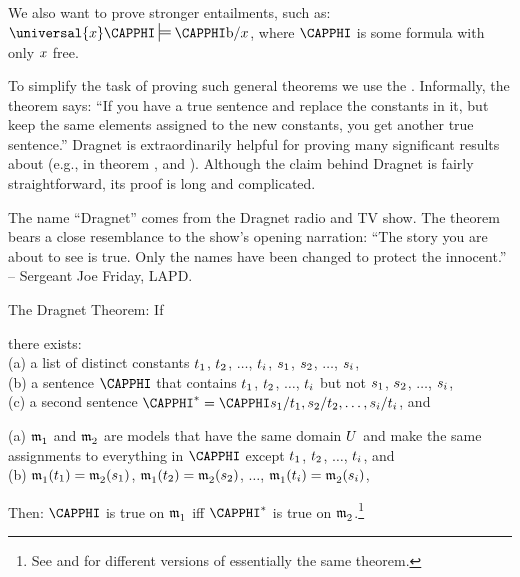 We also want to prove stronger entailments, such as: $\universal{\variable{x}}\CAPPHI\sdtstile{}{}\CAPPHI\constant{b}/\variable{x}$, where $\CAPPHI$ is some \GQL{} formula with only $x$ free.

To simplify the task of proving such general theorems we use the .
Informally, the theorem says: ``If you have a true sentence and replace the constants in it, but keep the same elements assigned to the new constants, you get another true sentence.''
Dragnet is extraordinarily helpful for proving many significant results about \GQL{} (e.g., in theorem , and ).
Although the claim behind Dragnet is fairly straightforward, its proof is long and complicated.
\\
\begin{commentary}
	The name ``Dragnet'' comes from the Dragnet radio and TV show.
    The theorem bears a close resemblance to the show's opening narration:
	``The story you are about to see is true. Only the names have been changed to protect the innocent.''
	-- Sergeant Joe Friday, LAPD.
\end{commentary}

\begin{THEOREM}{ The Dragnet Theorem:} If
\begin{cenumerate}
\item there exists: \\(a) a list of distinct constants $t_1$, $t_2$, $\ldots$, $t_{i}$, $s_1$, $s_2$, $\ldots$, $s_{i}$, \\(b) a \GQL{} sentence $\CAPPHI$ that contains $t_1$, $t_2$, $\ldots$, $t_{i}$ but not $s_1$, $s_2$, $\ldots$, $s_{i}$, \\(c) a second sentence $\CAPPHI^*=\CAPPHI\variable{s}_1/\variable{t}_1,\variable{s}_2/\variable{t}_2,\ldots,\variable{s}_{\integer{i}}/\variable{t}_{\integer{i}}$, and
\item (a) $\mathfrak{m^{\mathrm{}}_{\mathrm{1}}}$ and $\mathfrak{m^{\mathrm{}}_{\mathrm{2}}}$ are \GQL{} models that have the same domain $U$ and make the same assignments to everything in $\CAPPHI$ except $t_1$, $t_2$, $\ldots$, $t_{i}$, and \\(b) $\mathfrak{m^{\mathrm{}}_{\mathrm{1}}}(t_1)=\mathfrak{m^{\mathrm{}}_{\mathrm{2}}}(s_1)$, $\mathfrak{m^{\mathrm{}}_{\mathrm{1}}}(t_2)=\mathfrak{m^{\mathrm{}}_{\mathrm{2}}}(s_2)$, $\ldots$, $\mathfrak{m^{\mathrm{}}_{\mathrm{1}}}(t_{i})=\mathfrak{m^{\mathrm{}}_{\mathrm{2}}}(s_{i})$,
\end{cenumerate} 
Then: $\CAPPHI$ is true on $\mathfrak{m^{\mathrm{}}_{\mathrm{1}}}$ iff $\CAPPHI^*$ is true on $\mathfrak{m^{\mathrm{}}_{\mathrm{2}}}$.\footnote{
	See \citealt[66]{Mates1972} and \citealt[577]{Bergmann2003} for different versions of essentially the same theorem.
}

\end{THEOREM}

